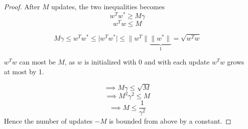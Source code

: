 \documentclass[12pt]{article}
\begin{document}
\begin{proof}
     
     \cleardoublepage
     
     After $M$ updates, the two inequalities becomes $$w^{T}w^{*} \geq M\gamma$$  $$w^{T}w \leq M$$
 
 $$M\gamma \leq w^{T}w^{*} \leq \vert w^{T}w^{*} \vert \leq \| w^{T} \| \underbrace{\|w^{*}\|}_\text{1}=\sqrt{w^{T}w}$$
 
 $w^{T}w$ can most be $M$, as $w$ is initialized with 0 and with each update $w^{T}w$ grows at most by 1.
 
 $$\implies M\gamma \leq \sqrt{M} $$
 $$\implies M^{2}\gamma^{2} \leq M$$
 $$\implies M \leq \frac{1}{\gamma ^{2}}$$  Hence the number of updates $-M$ is bounded from above by a constant.
  
 
 	
 \end{proof}
 
 
 
\end{document}
